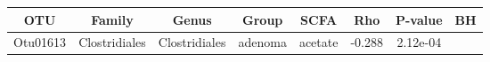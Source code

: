\documentclass[11pt,]{article}
\begin{document}
\scriptsize

\begin{longtable}[]{@{}cccccccc@{}}
\toprule
\begin{minipage}[b]{0.08\columnwidth}\centering\strut
OTU\strut
\end{minipage} & \begin{minipage}[b]{0.15\columnwidth}\centering\strut
Family\strut
\end{minipage} & \begin{minipage}[b]{0.15\columnwidth}\centering\strut
Genus\strut
\end{minipage} & \begin{minipage}[b]{0.08\columnwidth}\centering\strut
Group\strut
\end{minipage} & \begin{minipage}[b]{0.09\columnwidth}\centering\strut
SCFA\strut
\end{minipage} & \begin{minipage}[b]{0.07\columnwidth}\centering\strut
Rho\strut
\end{minipage} & \begin{minipage}[b]{0.08\columnwidth}\centering\strut
P-value\strut
\end{minipage} & \begin{minipage}[b]{0.08\columnwidth}\centering\strut
BH\strut
\end{minipage}\tabularnewline
\midrule
\endhead
\begin{minipage}[t]{0.08\columnwidth}\centering\strut
Otu01613\strut
\end{minipage} & \begin{minipage}[t]{0.15\columnwidth}\centering\strut
Clostridiales\strut
\end{minipage} & \begin{minipage}[t]{0.15\columnwidth}\centering\strut
Clostridiales\strut
\end{minipage} & \begin{minipage}[t]{0.08\columnwidth}\centering\strut
adenoma\strut
\end{minipage} & \begin{minipage}[t]{0.09\columnwidth}\centering\strut
acetate\strut
\end{minipage} & \begin{minipage}[t]{0.07\columnwidth}\centering\strut
-0.288\strut
\end{minipage} & \begin{minipage}[t]{0.08\columnwidth}\centering\strut
2.12e-04\strut
\end{minipage} & \begin{minipage}[t]{0.08\columnwidth}\centering\strut

\end{minipage}
\end{longtable}
\end{document}
